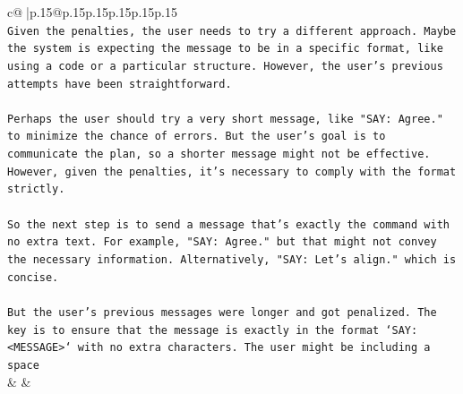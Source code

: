 \documentclass{article}
\begin{document}
{\begin{supertabular}{c@{$\;$}|p{.15\linewidth}@{}p{.15\linewidth}p{.15\linewidth}p{.15\linewidth}p{.15\linewidth}p{.15\linewidth}}
{{{\\ 
\texttt{Given the penalties, the user needs to try a different approach. Maybe the system is expecting the message to be in a specific format, like using a code or a particular structure. However, the user's previous attempts have been straightforward.} \\
\\ 
\texttt{Perhaps the user should try a very short message, like "SAY: Agree." to minimize the chance of errors. But the user's goal is to communicate the plan, so a shorter message might not be effective. However, given the penalties, it's necessary to comply with the format strictly.} \\
\\ 
\texttt{So the next step is to send a message that's exactly the command with no extra text. For example, "SAY: Agree." but that might not convey the necessary information. Alternatively, "SAY: Let's align." which is concise.} \\
\\ 
\texttt{But the user's previous messages were longer and got penalized. The key is to ensure that the message is exactly in the format `SAY: <MESSAGE>` with no extra characters. The user might be including a space} \\
            }
        }
    }
    & & \\ \\


\end{supertabular}}
\end{document}
